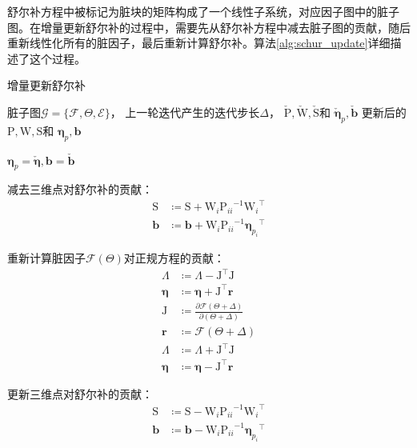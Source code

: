 舒尔补方程中被标记为脏块的矩阵构成了一个线性子系统，对应因子图中的脏子图。在增量更新舒尔补的过程中，需要先从舒尔补方程中减去脏子图的贡献，随后重新线性化所有的脏因子，最后重新计算舒尔补。算法\ref{alg:schur_update}详细描述了这个过程。

\begin{algorithm}
\caption{增量更新舒尔补}
\begin{algorithmic}
    \REQUIRE 脏子图$\mathcal{G}=\{\mathcal{F},\Theta,\mathcal{E}\}$，
             上一轮迭代产生的迭代步长$\Delta$，
             $\check{\mathrm{P}},\check{\mathrm{W}},\check{\mathrm{S}}$和
             $\check{\bm{\eta}}_p,\check{\bm{b}}$
    \ENSURE 更新后的
            $\mathrm{P},\mathrm{W},\mathrm{S}$和
            $\bm{\eta}_p,\bm{b}$

    \STATE $\bm{\eta}_p=\check{\bm{\eta}},\bm{b}=\check{\bm{b}}$

        \STATE 减去三维点对舒尔补的贡献：
        \[\begin{aligned}
                \mathrm{S} &\coloneqq \mathrm{S} + \mathrm{W}_i{\mathrm{P}_{ii}}^{-1}   {\mathrm{W}_i}^\top \\
                \bm{b}     &\coloneqq \bm{b}     + \mathrm{W}_i{\mathrm{P}_{ii}}^{-1}{\bm{\eta}_{p_i}}^\top
        \end{aligned}\]
    \ENDFOR

    \STATE 重新计算脏因子$\mathcal{F}(\Theta)$对正规方程的贡献：
    \[\begin{aligned}
            \Lambda    &\coloneqq \Lambda - \mathrm{J}^\top \mathrm{J}                                   \\
            \bm{\eta}  &\coloneqq \bm{\eta} + \mathrm{J}^\top \bm{r}                                     \\
            \mathrm{J} &\coloneqq \frac{\partial{\mathcal{F}(\Theta+\Delta)}}{\partial{(\Theta+\Delta)}} \\
            \bm{r}     &\coloneqq \mathcal{F}(\Theta+\Delta)                                             \\
            \Lambda    &\coloneqq \Lambda + \mathrm{J}^\top \mathrm{J}                                   \\
            \bm{\eta}  &\coloneqq \bm{\eta} - \mathrm{J}^\top \bm{r}
    \end{aligned}\]

        \STATE 更新三维点对舒尔补的贡献：
        \[\begin{aligned}
                \mathrm{S} &\coloneqq \mathrm{S} - \mathrm{W}_i{\mathrm{P}_{ii}}^{-1}   {\mathrm{W}_i}^\top \\
                \bm{b}     &\coloneqq \bm{b}     - \mathrm{W}_i{\mathrm{P}_{ii}}^{-1}{\bm{\eta}_{p_i}}^\top
        \end{aligned}\]
    \ENDFOR

\end{algorithmic}
\label{alg:schur_update}
\end{algorithm}

